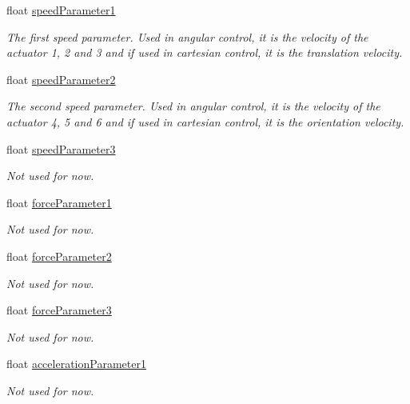 \begin{DoxyCompactItemize}
\item 
float \hyperlink{struct_zone_limitation_ad950b4fb26e50ef944208963fac5ed6a}{speed\+Parameter1}
\begin{DoxyCompactList}\small\item\em The first speed parameter. Used in angular control, it is the velocity of the actuator 1, 2 and 3 and if used in cartesian control, it is the translation velocity. \end{DoxyCompactList}\item 
float \hyperlink{struct_zone_limitation_a16a15e3160b4447b38b7c9d40ef88305}{speed\+Parameter2}
\begin{DoxyCompactList}\small\item\em The second speed parameter. Used in angular control, it is the velocity of the actuator 4, 5 and 6 and if used in cartesian control, it is the orientation velocity. \end{DoxyCompactList}\item 
float \hyperlink{struct_zone_limitation_a6db5f0c7f4a59fae6871ec518a7dc9c2}{speed\+Parameter3}
\begin{DoxyCompactList}\small\item\em Not used for now. \end{DoxyCompactList}\item 
float \hyperlink{struct_zone_limitation_aba463cd66d41b3ada5a702a9e1179ee4}{force\+Parameter1}
\begin{DoxyCompactList}\small\item\em Not used for now. \end{DoxyCompactList}\item 
float \hyperlink{struct_zone_limitation_aecd1956a2eae32a16b7e0c28e6191e1b}{force\+Parameter2}
\begin{DoxyCompactList}\small\item\em Not used for now. \end{DoxyCompactList}\item 
float \hyperlink{struct_zone_limitation_a00785b40bfee162c2c86692c5882c9d6}{force\+Parameter3}
\begin{DoxyCompactList}\small\item\em Not used for now. \end{DoxyCompactList}\item 
float \hyperlink{struct_zone_limitation_af1fd03a90f7a3abd910a734ea35484c0}{acceleration\+Parameter1}
\begin{DoxyCompactList}\small\item\em Not used for now. \end{DoxyCompactList}\item 

\end{DoxyCompactItemize}
